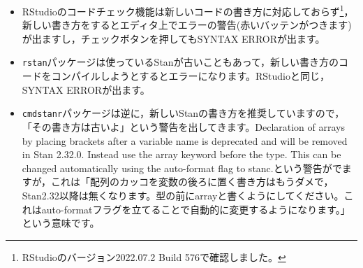 \begin{itemize}
	\item RStudioのコードチェック機能は新しいコードの書き方に対応しておらず\footnote{RStudioのバージョン2022.07.2 Build 576で確認しました。}，新しい書き方をするとエディタ上でエラーの警告(赤いバッテンがつきます)が出ますし，チェックボタンを押してもSYNTAX ERRORが出ます。
	\item \verb|rstan|パッケージは使っているStanが古いこともあって，新しい書き方のコードをコンパイルしようとするとエラーになります。RStudioと同じ，SYNTAX ERRORが出ます。
	\item \verb|cmdstanr|パッケージは逆に，新しいStanの書き方を推奨していますので，「その書き方は古いよ」という警告を出してきます。Declaration of arrays by placing brackets after a variable name is deprecated and will be removed in Stan 2.32.0. Instead use the array keyword before the type. This can be changed automatically using the auto-format flag to stanc.という警告がでますが，これは「配列のカッコを変数の後ろに置く書き方はもうダメで，Stan2.32以降は無くなります。型の前にarrayと書くようにしてください。これはauto-formatフラグを立てることで自動的に変更するようになります。」という意味です。
\end{itemize}
